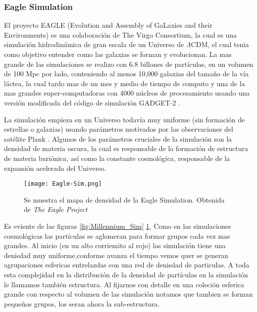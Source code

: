 \subsubsection{Eagle Simulation}
El proyecto EAGLE (Evolution and Assembly of GaLaxies and their Environments)  es una colaboración de The Virgo Consortium, la cual es una simulación hidrodinámica de gran escala de un Universo de $\Lambda$CDM, el cual tenia como objetivo entender como las galaxias se forman y evolucionan. La mas grande de las simulaciones se realizo con  6.8 billones de partículas, en un volumen de 100 Mpc por lado, conteniendo al menos 10,000 galaxias del tamaño de la vía láctea, la cual tardo mas de un mes y medio de tiempo de computo y una de la mas grandes super-computadoras con 4000 núcleos de procesamiento usando una versión modificada del código de simulación GADGET-2 \cite{2015MNRAS.450.1937C, 2015MNRAS.446..521S}.

La simulación empieza en un Universo todavía muy uniforme (sin formación de estrellas o galaxias) usando parámetros motivados por las observaciones del satélite Plank \cite{ 2013ApJS..208...20B, 2020A&A...641A...1P}. Algunos de los parámetros cruciales de la simulación son la densidad de materia oscura, la cual es responsable de la formación de estructura de materia bariónica, así como la constante cosmológica, responsable de la expansión acelerada del Universo.
       
\begin{figure}[H]
    \centering
    \texttt{[image: Eagle-Sim.png]}
    \caption[Eagle Simulation Cosmic Web]{Se muestra el mapa de densidad de la Eagle Simulation. Obtenida de \textit{The Eagle Project} }
    \label{fig:Eagle_Sim}
\end{figure}

Es eviente de las figuras \ref{fig:Millennium_Sim} \ref{fig:Eagle_Sim}, Como en las simulaciones cosmológicas las partículas se aglomeran para formar grupos cada vez mas grandes. Al inicio (en un alto corriemito al rojo) las simulación tiene una denisdad muy uniforme,conforme avanza el tiempo vemos quer se generan agrupaciones esfericas entrelazdas con una red de denisdad de particulas. A toda esta complejidad en la distribución de la densidad de partículas en la simulación le llamamos también estructura. Al fijarnos con detalle en una coleción esferica grande con respecto al volumen de las simulación notamos que tambien se forman pequeños grupos, los seran ahora la sub-estructura.
